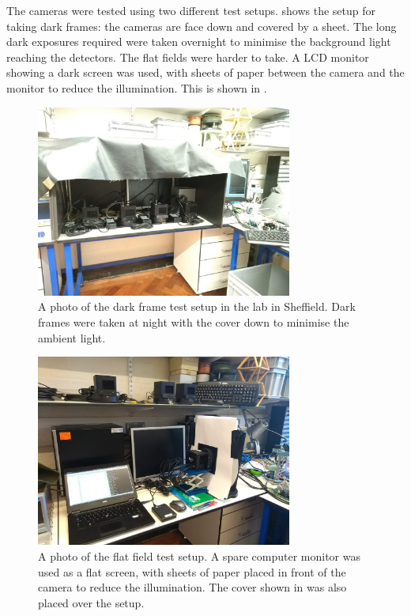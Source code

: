 \begin{colsection}
\begin{colsection}
The cameras were tested using two different test setups.  shows the setup for taking dark frames: the cameras are face down and covered by a sheet. The long dark exposures required were taken overnight to minimise the background light reaching the detectors. The flat fields were harder to take. A LCD monitor showing a dark screen was used, with sheets of paper between the camera and the monitor to reduce the illumination. This is shown in .

\begin{figure}[p]
    \begin{center}
        \includegraphics[width=0.75\textwidth]{images/dark_photo.jpg}
    \end{center}
    \caption[The dark frame test setup]{
        A photo of the dark frame test setup in the lab in Sheffield. Dark frames were taken at night with the cover down to minimise the ambient light.
    }\label{fig:dark_photo}
\end{figure}

\begin{figure}[p]
    \begin{center}
        \includegraphics[width=0.75\textwidth]{images/flat_photo.jpg}
    \end{center}
    \caption[The flat field test setup]{
        A photo of the flat field test setup. A spare computer monitor was used as a flat screen, with sheets of paper placed in front of the camera to reduce the illumination. The cover shown in  was also placed over the setup.
    }\label{fig:flat_photo}
\end{figure}


\end{colsection}
\end{colsection}

